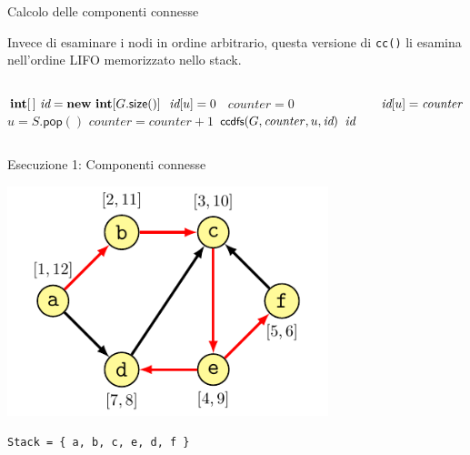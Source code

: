 \begin{frame}[fragile]{Calcolo delle componenti connesse}
 
Invece di esaminare i nodi in ordine arbitrario, questa versione di
\texttt{cc()} li esamina nell'ordine LIFO memorizzato nello stack.

\vspace{-12pt}
\begin{columns}[T]
\begin{Procedure}
\caption[A]{\connectedcomponents(\Graph $G$, \alert{$\Stack\ S$})}
$\INTEGER[\,]\ \components = \NEW\ \INTEGER[G.\textsf{size}()]$\;
{
  $\textit{id}[u] = 0$
}
\INTEGER\ $\mathit{counter} = 0$\;
{
  \alert{$u = S.\textsf{pop}()$}\;
  {
    $\mathit{counter} = \mathit{counter}+1$\;
    $\textsf{{\small ccdfs}}(G, \mathit{counter}, u, \textit{id})$\;
  }
}
\Return $\textit{id}$\;
\end{Procedure}
\begin{Procedure}
\caption[A]{\ccdfs(\Graph $G$, \INTEGER\ $\mathit{counter}$, \Node\ $u$, $\INTEGER[\,]\ \components$)}
$\textit{id}[u] = \mathit{counter}$\;
{
}
\end{Procedure}
\end{columns}
\end{frame}

\begin{frame}{Esecuzione 1: Componenti connesse}
    

\begin{overprint}
\centering\includegraphics[width=0.7\textwidth,page=4]{scc3.pdf}
\end{overprint}
\Large
\texttt{Stack = \{ a, b, c, e, d, f \} }

\end{frame}



